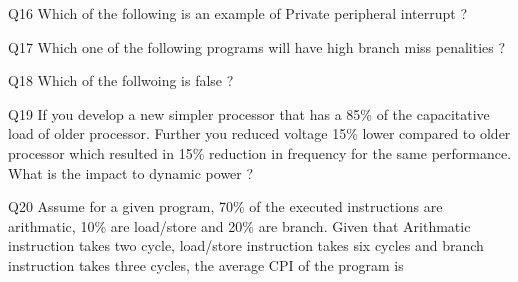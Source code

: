 \documentclass[a4paper]{article}
\begin{document}
{\begin{question}{Q16}
  Which of the following is an example of Private peripheral interrupt ? 
  \begin{choices}
  \end{choices}
\end{question}


\begin{question}{Q17}
  Which one of the following programs will have high branch miss penalities ? 
  \begin{choices}
  \end{choices}
\end{question}


\begin{question}{Q18}
  Which of the follwoing is false ? 
  \begin{choices}
  \end{choices}
\end{question}


\begin{question}{Q19}
  If you develop a new simpler processor that has a 85\% of the capacitative load of older processor. Further you reduced voltage 15\% lower compared to older processor which resulted in 15\% reduction in frequency for the same performance. What is the impact to dynamic power ?  
  \begin{choices}
  \end{choices}
\end{question}


\begin{question}{Q20}
  Assume for a given program, 70\% of the executed instructions are arithmatic, 10\% are load/store and 20\% are branch. Given that Arithmatic instruction takes two cycle, load/store instruction takes six cycles and branch instruction takes three cycles, the average CPI of the program is 
  \begin{choices}
  \end{choices}
\end{question}



\clearpage
}   
\end{document}
